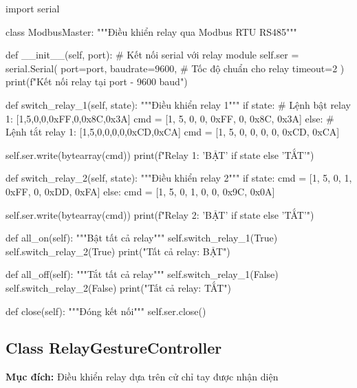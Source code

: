 \begin{aivncodebox}
\begin{python}
import serial

class ModbusMaster:
    """Điều khiển relay qua Modbus RTU RS485"""
    
    def __init__(self, port):
        # Kết nối serial với relay module
        self.ser = serial.Serial(
            port=port,
            baudrate=9600,    # Tốc độ chuẩn cho relay
            timeout=2
        )
        print(f"Kết nối relay tại {port} - 9600 baud")
    
    def switch_relay_1(self, state):
        """Điều khiển relay 1"""
        if state:
            # Lệnh bật relay 1: [1,5,0,0,0xFF,0,0x8C,0x3A]
            cmd = [1, 5, 0, 0, 0xFF, 0, 0x8C, 0x3A]
        else:
            # Lệnh tắt relay 1: [1,5,0,0,0,0,0xCD,0xCA]
            cmd = [1, 5, 0, 0, 0, 0, 0xCD, 0xCA]
        
        self.ser.write(bytearray(cmd))
        print(f"Relay 1: {'BẬT' if state else 'TẮT'}")
    
    def switch_relay_2(self, state):
        """Điều khiển relay 2"""
        if state:
            cmd = [1, 5, 0, 1, 0xFF, 0, 0xDD, 0xFA]
        else:
            cmd = [1, 5, 0, 1, 0, 0, 0x9C, 0x0A]
        
        self.ser.write(bytearray(cmd))
        print(f"Relay 2: {'BẬT' if state else 'TẮT'}")
    
    def all_on(self):
        """Bật tất cả relay"""
        self.switch_relay_1(True)
        self.switch_relay_2(True)
        print("Tất cả relay: BẬT")
    
    def all_off(self):
        """Tắt tất cả relay"""
        self.switch_relay_1(False)
        self.switch_relay_2(False)
        print("Tất cả relay: TẮT")
    
    def close(self):
        """Đóng kết nối"""
        self.ser.close()
\end{python}
\end{aivncodebox}

\subsection{Class RelayGestureController}
\textbf{Mục đích:} Điều khiển relay dựa trên cử chỉ tay được nhận diện

